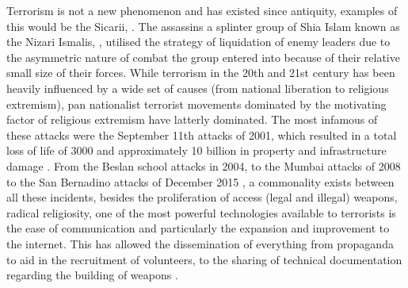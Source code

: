 \documentclass[11pt,twocolumn]{article}
\begin{document}
Terrorism is not a new phenomenon and has existed since antiquity, examples of this would be the Sicarii, \citep{smith1995zealots}. The assassins a splinter group of Shia Islam known as the Nizari Ismalis, \citep{daftary1994assassin}, utilised the strategy of liquidation of enemy leaders due to the asymmetric nature of combat the group entered into because of their relative small size of their forces.
While terrorism in the 20th and 21st century has been heavily influenced by a wide set of causes (from national liberation to religious extremism), pan nationalist terrorist movements dominated by the motivating factor of religious extremism have latterly dominated. The most infamous of these attacks were the September 11th attacks of 2001, which resulted in a total loss of life of 3000 and approximately 10 billion in property and infrastructure damage \citep{brady2015better}. From the Beslan school attacks \citep{moscardino2007narratives} in 2004, to the Mumbai attacks of 2008 \citep{stelter2008citizen} to the San Bernadino attacks of December 2015 \citep{noboa2016violent}, a commonality exists between all these incidents, besides the proliferation of access (legal and illegal) weapons, radical religiosity, one of the most powerful technologies available to terrorists is the ease of communication and particularly the expansion and improvement to the internet. This has allowed the  dissemination of everything from propaganda to aid in the recruitment of volunteers, to the sharing of technical documentation regarding the building of weapons  \citep{warren2008terrorism}.
\end{document}
